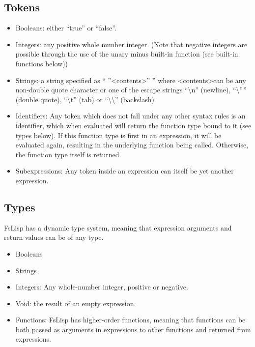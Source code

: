 \documentclass[11pt]{article}
\begin{document}
    \subsection{Tokens}
        \begin{itemize}
            \item Booleans: either “true” or “false”.
            \item Integers: any positive whole number integer. (Note that negative integers are possible through the use of the unary minus built-in function (see built-in functions below))
            \item Strings: a string specified as “ ”\textless contents\textgreater” ” where \textless contents\textgreater \bigskip can be any non-double quote character or one of the escape strings “\textbackslash n” (newline), “\textbackslash”” (double quote), “\textbackslash t” (tab) or “\textbackslash \textbackslash” (backslash)
            \item Identifiers: Any token which does not fall under any other syntax rules is an identifier, which when evaluated will return the function type bound to it (see types below). If this function type is first in an expression, it will be evaluated again, resulting in the underlying function being called. Otherwise, the function type itself is returned.
        \item Subexpressions: Any token inside an expression can itself be yet another expression.
        \end{itemize}

    \subsection{Types}
    FsLisp has a dynamic type system, meaning that expression arguments and return values can be of any type.
        \begin{itemize}
            \item Booleans
            \item Strings
            \item Integers: Any whole-number integer, positive or negative. 
            \item Void: the result of an empty expression.
            \item Functions: FsLisp has higher-order functions, meaning that functions can be both passed as arguments in expressions to other functions and returned from expressions.
        \end{itemize}
\end{document}
